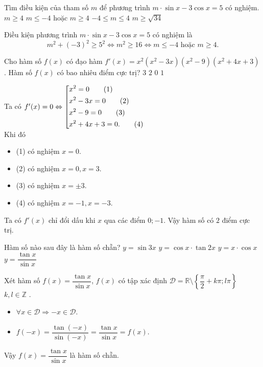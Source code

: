 \begin{ex}%
	Tìm điều kiện của tham số $m$ để phương trình $m\cdot\sin x-3\cos x=5$ có nghiệm.
	\choice
	{$m\ge 4$}
	{\True $m\le-4$ hoặc $m\ge4$}
	{$-4\le m \le 4$}
	{$m\ge \sqrt{34}$}
	\loigiai
	{
		Điều kiện phương trình $m\cdot\sin x-3\cos x=5$ có nghiệm là 
		\[m^2+(-3)^2\ge5^2 \Leftrightarrow m^2\ge16 \Leftrightarrow m\le-4\text{ hoặc }m\ge4.\]
		
	}
\end{ex}

\begin{ex}%
	Cho hàm số $f(x)$ có đạo hàm $f'(x)=x^2(x^2-3x)(x^2-9)(x^2+4x+3)$. Hàm số $f(x)$ có bao nhiêu điểm cực trị?
	\choice
	{$3$}
	{\True $2$}
	{$0$}
	{$1$}
	\loigiai
	{
		Ta có $f'(x)=0\Leftrightarrow \left[\begin{aligned}&x^2=0\qquad(1)\\&x^2-3x=0\qquad(2)\\&x^2-9=0\qquad(3)\\&x^2+4x+3=0.\qquad(4)\end{aligned}\right.$\\
		Khi đó
		\begin{itemize}
			\item (1) có nghiệm $x=0$.
			\item (2) có nghiệm $x=0, x=3$.
			\item (3) có nghiệm $x=\pm3$.
			\item (4) có nghiệm $x=-1, x=-3$.
		\end{itemize}
		Ta có $f'(x)$ chỉ đổi dấu khi $x$ qua các điểm $0; -1$.
		Vậy hàm số có $2$ điểm cực trị.
	}
\end{ex}


\begin{ex}%
	Hàm số nào sau đây là hàm số chẵn?
	\choice
	{$y=\sin 3x$}
	{$y=\cos x \cdot \tan 2x$}
	{$y=x\cdot\cos x$}
	{\True $y=\dfrac{\tan x}{\sin x}$}
	\loigiai
	{
		Xét hàm số $f(x)=\dfrac{\tan x}{\sin x}$, $f(x)$ có tập xác định $\mathscr{D}=\mathbb{R} \setminus \left\lbrace \dfrac{\pi}{2}+k\pi;l\pi\right\rbrace $  $k,l \in \mathbb{Z}$ .
		\begin{itemize}
			\item $\forall x \in \mathscr{D} \Rightarrow -x \in \mathscr{D}$.
			\item $f(-x)=\dfrac{\tan (-x)}{\sin (-x)}=\dfrac{\tan x}{\sin x}=f(x)$.
		\end{itemize}
		Vậy $f(x)=\dfrac{\tan x}{\sin x}$ là hàm số chẵn.
	}
\end{ex}


